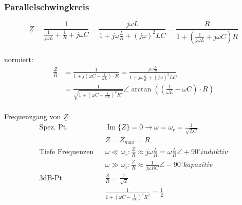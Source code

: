   
\subsubsection{Parallelschwingkreis}
$$\underline{Z} = \frac{1}{\frac{1}{j\omega L}+\frac{1}{R} + j \omega C}
= \frac{j\omega L}{1+j\omega \frac{L}{R}+(j\omega)^2LC}
= \frac{R}{1+(\frac{1}{j\omega L}+j\omega C)R}$$\\
normiert:\\
\begin{align}
\frac{\underline{Z}}{R}&=\frac{1}{1+j(\omega C-\frac{1}{\omega L})\cdot R}
=\frac{j\omega \frac{L}{R}}{1+j\omega\frac{L}{R}+(j\omega)^2LC}\nonumber\\
&=\frac{1}{\sqrt{1+(\omega C - \frac{1}{\omega
L})^2R^2}} \angle \arctan{((\frac{1}{\omega L}-\omega C)\cdot R)} \nonumber
\end{align}\\

Frequenzgang von $\underline Z$:\\
\begin{align}
	\text{Spez. Pt.}&&
	\operatorname{Im}{\{Z\}} = 0 \rightarrow \omega =
	\omega_r=\frac{1}{\sqrt{LC}}\nonumber\\ && Z = Z_{max} = R\nonumber\\
	\text{Tiefe Frequenzen} &&
	\omega \ll \omega_r: \frac{\underline Z}{R} \approx
	j\omega\frac{L}{R}=\omega\frac{L}{R} \angle +90^\circ induktiv\nonumber\\ && \omega \gg \omega_r: \frac{\underline Z}{R} \approx \frac{1}{j\omega RC}
	\angle -90^\circ kapazitiv\nonumber\\
	\text{3dB-Pt} &&
	\frac{Z}{R}=\frac{1}{\sqrt{2}}\nonumber\\
	&& \frac{1}{1+(\omega C-\frac{1}{\omega L})^2R^2}=\frac{1}{2}\nonumber
\end{align}\\

% 	



